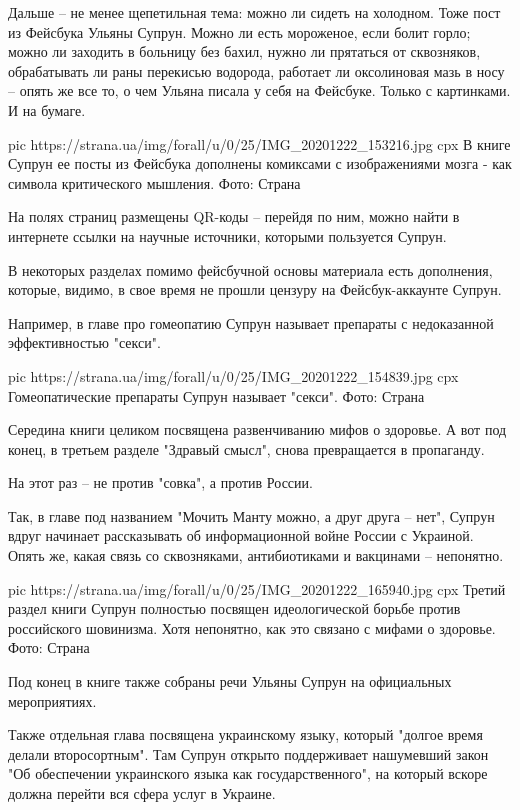 Дальше – не менее щепетильная тема: можно ли сидеть на холодном. Тоже пост из
Фейсбука Ульяны Супрун. Можно ли есть мороженое, если болит горло; можно ли
заходить в больницу без бахил, нужно ли прятаться от сквозняков, обрабатывать
ли раны перекисью водорода, работает ли оксолиновая мазь в носу – опять же все
то, о чем Ульяна писала у себя на Фейсбуке. Только с картинками. И на бумаге.

\ifcmt
pic https://strana.ua/img/forall/u/0/25/IMG_20201222_153216.jpg
cpx В книге Супрун ее посты из Фейсбука дополнены комиксами с изображениями мозга - как символа критического мышления. Фото: Страна
\fi

На полях страниц размещены QR-коды – перейдя по ним, можно найти в интернете
ссылки на научные источники, которыми пользуется Супрун. 

В некоторых разделах помимо фейсбучной основы материала есть дополнения,
которые, видимо, в свое время не прошли цензуру на Фейсбук-аккаунте Супрун.
 
Например, в главе про гомеопатию Супрун называет препараты с недоказанной
эффективностью "секси".

\ifcmt
pic https://strana.ua/img/forall/u/0/25/IMG_20201222_154839.jpg
cpx Гомеопатические препараты Супрун называет "секси". Фото: Страна
\fi

Середина книги целиком посвящена развенчиванию мифов о здоровье. А вот под
конец, в третьем разделе "Здравый смысл", снова превращается в пропаганду.
 
На этот раз – не против "совка", а против России.
 
Так, в главе под названием "Мочить Манту можно, а друг друга – нет", Супрун
вдруг начинает рассказывать об информационной войне России с Украиной. Опять
же, какая связь со сквозняками, антибиотиками и вакцинами – непонятно.

\ifcmt
pic https://strana.ua/img/forall/u/0/25/IMG_20201222_165940.jpg
cpx Третий раздел книги Супрун полностью посвящен идеологической борьбе против российского шовинизма. Хотя непонятно, как это связано с мифами о здоровье. Фото: Страна
\fi

Под конец в книге также собраны речи Ульяны Супрун на официальных мероприятиях.
 
Также отдельная глава посвящена украинскому языку, который "долгое время делали
второсортным". Там Супрун открыто поддерживает нашумевший закон "Об обеспечении
украинского языка как государственного", на который вскоре должна перейти вся
сфера услуг в Украине.
 

